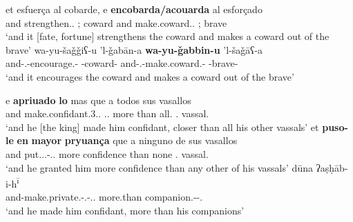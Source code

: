 \documentclass[output=paper]{langscibook}
\begin{document}
\begin{exe}
    \ex\label{doehla:ex:9}
    \begin{xlist}
        \ex\label{doehla:ex:9a}
        \gll et esfuerça al cobarde, e {\textbf{encobarda/acouarda}} al esforçado \\
        and strengthen.\Third\SG.\PRS{} \OBJ;\Def{} coward and make.coward.\Third\SG.\PRS{} \OBJ;\Def{} brave \\
        \glt ‘and it [fate, fortune] strengthens the coward and makes a coward out of the brave’ \citep[A/BI.174t]{dohla_libro_2009}
        \ex\label{doehla:ex:9b}
        \gll wa-yu-šaǧǧiʕ-u 'l-ǧabān-a {\textbf{wa-yu-ǧabbin-u}} 'l-šaǧāʕ-a \\
        and-\Third\SG.\M-encourage.\IPFV-\IND{} \Def-coward-\ACC{} and-\Third\SG.\M-make.coward.\IPFV-\IND{} \Def-brave-\ACC{} \\
        \glt ‘and it encourages the coward and makes a coward out of the brave’ \citep[fo. 49r]{ibn_al-muqaffa_kitab_nodate}
    \end{xlist}
\end{exe}
\begin{exe}
    \ex\label{doehla:ex:10}
    \begin{xlist}
        \ex\label{doehla:ex:10a}
        \gll e \textbf{apriuado} \textbf{lo} mas que a todos sus vasallos \\
        and make.confidant.3\SG.\PST.\PFV{} \OBJ.\Third\SG.\M{} more than \OBJ{} all.\PL{} \POSS.\Third\PL{} vassal.\PL{} \\
        \glt ‘and he [the king] made him confidant, closer than all his other vassals’ \citep[AXII.16]{dohla_libro_2009}
        \ex\label{doehla:ex:10b}
        \gll et \textbf{puso-le} \textbf{en} \textbf{mayor} \textbf{pryuança} que a ninguno de sus vasallos \\
        and put.\Third\SG.\PST.\PFV-\OBJ.\Third\SG.\M{} \LOC{} more confidence than \OBJ{} none \GEN{} \POSS.\Third\PL{} vassal.\PL{} \\
        \glt ‘and he granted him more confidence than any other of his vassals’ \citep[BXII.16]{dohla_libro_2009}
        \ex\label{doehla:ex:10c}
         dūna {ʔaṣḥāb-i-h\textsuperscript{ī}} \\
        and-make.private.\PFV-\Third\SG.\M-\OBJ.\Third\SG.\M{} more.than companion.\PL-\GEN-\POSS.\Third\SG{} \\
        \glt ‘and he made him confidant, more than his companions’ \citep[94v]{azzam_kitab_1941}\footnotemark[17]
    \end{xlist}
\end{exe}
\end{document}
